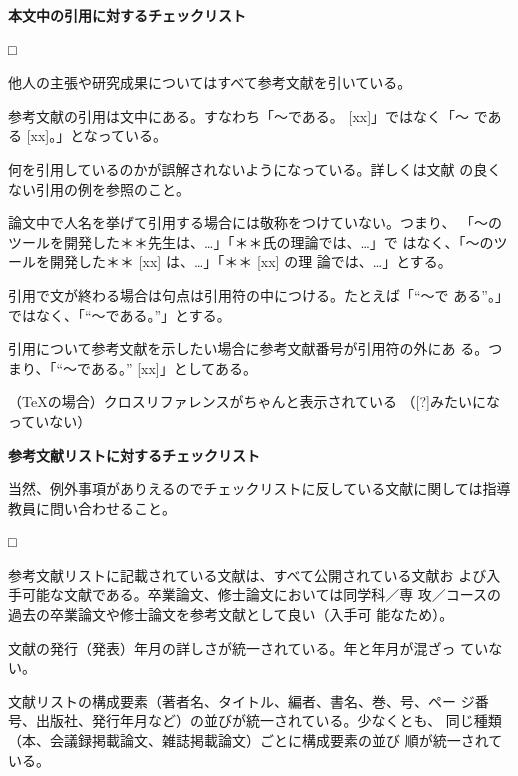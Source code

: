 \documentclass[11pt,a4j]{jsarticle}
\begin{document}
\begin{flushleft}
 {\bf 本文中の引用に対するチェックリスト}
\end{flushleft}
\begin{list}%
 {□} %
 {} %
 \item 他人の主張や研究成果についてはすべて参考文献を引いている。
 \item 参考文献の引用は文中にある。すなわち「〜である。 [xx]」ではなく「〜
       である [xx]。」となっている。
 \item 何を引用しているのかが誤解されないようになっている。詳しくは文献
       \cite{Sakai_HowToWrite_02}の良くない引用の例を参照のこと。
 \item 論文中で人名を挙げて引用する場合には敬称をつけていない。つまり、
       「〜のツールを開発した＊＊先生は、…」「＊＊氏の理論では、…」で
       はなく、「〜のツールを開発した＊＊ [xx] は、…」「＊＊ [xx] の理
       論では、…」とする。
 \item 引用で文が終わる場合は句点は引用符の中につける。たとえば「``〜で
       ある''。」ではなく、「``〜である。''」とする。
 \item 引用について参考文献を示したい場合に参考文献番号が引用符の外にあ
       る。つまり、「``〜である。'' [xx]」としてある。
 \item （TeXの場合）クロスリファレンスがちゃんと表示されている
       （[?]みたいになっていない）

\end{list}


\begin{flushleft}
 {\bf 参考文献リストに対するチェックリスト}
\end{flushleft}
当然、例外事項がありえるのでチェックリストに反している文献に関しては指導
教員に問い合わせること。
\begin{list}%
 {□} %
 {} %
 \item 参考文献リストに記載されている文献は、すべて公開されている文献お
       よび入手可能な文献である。卒業論文、修士論文においては同学科／専
       攻／コースの過去の卒業論文や修士論文を参考文献として良い（入手可
       能なため）。
 \item 文献の発行（発表）年月の詳しさが統一されている。年と年月が混ざっ
       ていない。
 \item 文献リストの構成要素（著者名、タイトル、編者、書名、巻、号、ペー
       ジ番号、出版社、発行年月など）の並びが統一されている。少なくとも、
       同じ種類（本、会議録掲載論文、雑誌掲載論文）ごとに構成要素の並び
       順が統一されている。
\end{list}
\end{document}
